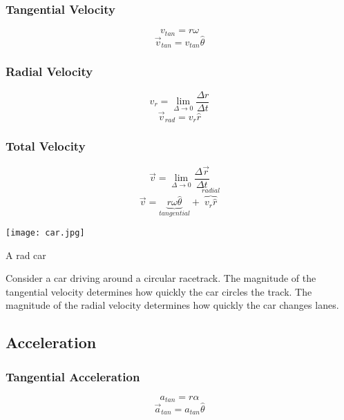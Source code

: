 \subsubsection{Tangential Velocity}
$$v_{tan}=r\omega$$
$$\overrightarrow{v}_{tan}=v_{tan}\hat{\theta}$$

\subsubsection{Radial Velocity}
$$v_r=\lim_{\Delta \rightarrow 0}\frac{\Delta r}{\Delta t}$$
$$\overrightarrow{v}_{rad}=v_r\hat{r}$$
\subsubsection{Total Velocity}
$$\overrightarrow{v}=\lim_{\Delta \rightarrow 0}\frac{\Delta \overrightarrow{r}}{\Delta t}$$
$$\overrightarrow{v}=\underbrace{r\omega\hat{\theta}}_{\textit{tangential}}+\overbrace{v_r\hat{r}}^{\textit{radial}}$$

\vspace{1cm}


\begin{marginfigure}[70pt]%
  \texttt{[image: car.jpg]}
  \caption{A rad car}
  \label{fig:marginfig}
\end{marginfigure}
\noindent Consider a car driving around a circular racetrack.  The magnitude of the tangential velocity determines how quickly the car circles the track.  The magnitude of the radial velocity determines how quickly the car changes lanes.  

\newpage

\subsection{Acceleration}

\vspace{1cm}

\subsubsection{Tangential Acceleration}
$$a_{tan}=r\alpha$$
$$\overrightarrow{a}_{tan}=a_{tan}\hat{\theta}$$
